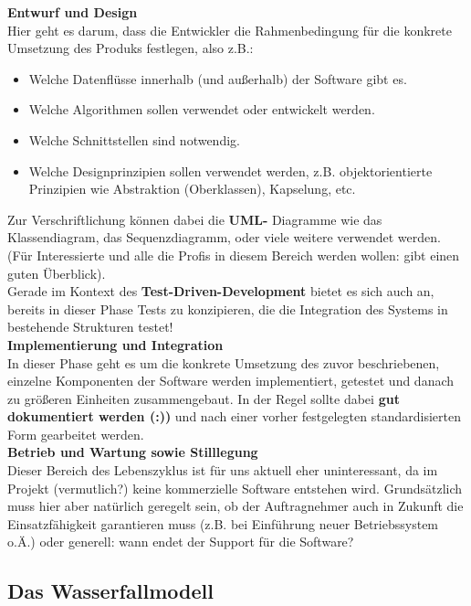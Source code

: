 \documentclass{article}
\begin{document}
\textbf{Entwurf und Design}\\
Hier geht es darum, dass die Entwickler die Rahmenbedingung für die konkrete Umsetzung des Produks festlegen, also z.B.:
\begin{itemize}
    \item Welche Datenflüsse innerhalb (und außerhalb) der Software gibt es.
    \item Welche Algorithmen sollen verwendet oder entwickelt werden. 
    \item Welche Schnittstellen sind notwendig.
    \item Welche Designprinzipien sollen verwendet werden, z.B. objektorientierte Prinzipien wie Abstraktion (Oberklassen), Kapselung, etc. 
\end{itemize}
Zur Verschriftlichung können dabei die \textbf{UML-} Diagramme wie das Klassendiagram, das Sequenzdiagramm, oder viele weitere verwendet werden. (Für Interessierte und alle die Profis in diesem Bereich werden wollen:  gibt einen guten Überblick). \\
Gerade im Kontext des \textbf{Test-Driven-Development} bietet es sich auch an, bereits in dieser Phase Tests zu konzipieren, die die Integration des Systems in bestehende Strukturen testet! \vspace{3mm} \\

\textbf{Implementierung und Integration} \\
In dieser Phase geht es um die konkrete Umsetzung des zuvor beschriebenen, einzelne Komponenten der Software werden implementiert, getestet und danach zu größeren Einheiten zusammengebaut. In der Regel sollte dabei \textbf{gut dokumentiert werden (:))} und nach einer vorher festgelegten standardisierten Form gearbeitet werden. \vspace{3mm}\\

\textbf{Betrieb und Wartung sowie Stilllegung} \\
Dieser Bereich des Lebenszyklus ist für uns aktuell eher uninteressant, da im Projekt (vermutlich?) keine kommerzielle Software entstehen wird. Grundsätzlich muss hier aber natürlich geregelt sein, ob der Auftragnehmer auch in Zukunft die Einsatzfähigkeit garantieren muss (z.B. bei Einführung neuer Betriebssystem o.Ä.) oder generell: wann endet der Support für die Software?


\subsection{Das Wasserfallmodell}
\end{document}
